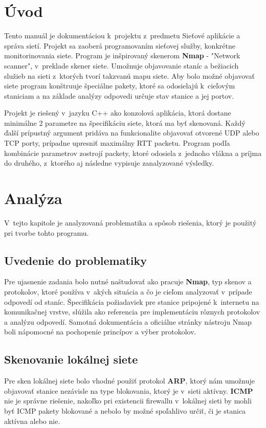 
\chapter{Úvod}
Tento manuál je dokumentáciou k~projektu z~predmetu Sieťové aplikácie a správa sietí. Projekt sa zaoberá programovaním sieťovej služby, konkrétne monitorinovania siete. Program je inšpirovaný skenerom \textbf{Nmap} - "Network scanner", v~preklade skener siete. Umožnuje objavovanie staníc a bežiacich služieb na sieti z~ktorých tvorí takzvanú mapu siete. Aby bolo možné objavovať siete program konštruuje špeciálne pakety, ktoré sa odosielajú k~cieľovým staniciam a na základe analýzy odpovedi určuje stav stanice a jej portov. 

Projekt je riešený v~jazyku C++ ako konzolová aplikácia, ktorá dostane minimálne 2 parametre na špecifikáciu siete, ktorá ma byť skenovaná. Každý ďalší prípustný argument pridáva na funkcionalite objavovať otvorené UDP alebo TCP porty, prípadne upresniť maximálny RTT packetu. Program podľa kombinácie parametrov zostrojí packety, ktoré odosiela z~jednoho vlákna a príjma do druhého, z~ktorého aj následne vypisuje zanalyzované výsledky.

\newpage


\chapter{Analýza}
V~tejto kapitole je analyzovaná problematika a spôsob riešenia, ktorý je použitý pri tvorbe tohto programu.

\section{Uvedenie do problematiky}

Pre ujasnenie zadania bolo nutné naštudovať ako pracuje \textbf{Nmap}, typ skenov a protokolov, ktoré používa v~akých situácia a čo je cieľom analyzovať v~prípade odpovedí od staníc. Špecifikácia požiadaviek pre stanice pripojené k~internetu na komunikačnej vrstve\cite{1122}, slúžila ako referencia pre implementáciu rôznych protokolov a analýzu odpovedí. Samotná dokumentácia a oficiálne stránky nástroju Nmap boli nápomocné na pochopenie princípov a výber protokolov\cite{nmap}.

\section{Skenovanie lokálnej siete}
Pre sken lokálnej siete bolo vhodné použiť protokol \textbf{ARP}, ktorý nám umožnuje objavovať stanice nezávisle na type blokovania, ktorý je v~sieti aktívny. \textbf{ICMP} nie je správne riešenie, nakoľko pri existencii firewallu v~lokálnej sieti by mohli byť ICMP pakety blokované a nebolo by možné spoľahlivo určiť, či je stanica aktívna alebo nie. 

